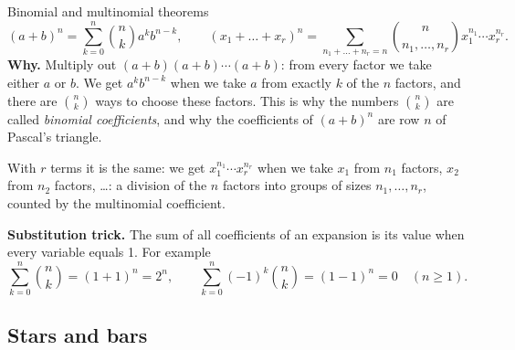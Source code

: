 \begin{key}{Binomial and multinomial theorems}
	\[ (a+b)^n=\sum_{k=0}^n\binom nk a^kb^{n-k},\qquad
		(x_1+\dots+x_r)^n=\sum_{n_1+\dots+n_r=n}\binom{n}{n_1,\dots,n_r}
		x_1^{n_1}\cdots x_r^{n_r}. \]
	\textbf{Why.} Multiply out $(a+b)(a+b)\cdots(a+b)$: from every factor we
	take either $a$ or $b$. We get $a^kb^{n-k}$ when we take $a$ from exactly
	$k$ of the $n$ factors, and there are $\binom nk$ ways to choose these
	factors. This is why the numbers $\binom nk$ are called \emph{binomial
		coefficients}, and why the coefficients of $(a+b)^n$ are row $n$ of
	Pascal's triangle.

	With $r$ terms it is the same: we get $x_1^{n_1}\cdots x_r^{n_r}$ when we
	take $x_1$ from $n_1$ factors, $x_2$ from $n_2$ factors, \dots: a division
	of the $n$ factors into groups of sizes $n_1,\dots,n_r$, counted by the
	multinomial coefficient.

	\textbf{Substitution trick.} The sum of all coefficients of an expansion is
	its value when every variable equals 1. For example
	\[ \sum_{k=0}^n\binom nk=(1+1)^n=2^n,\qquad
		\sum_{k=0}^n(-1)^k\binom nk=(1-1)^n=0\quad(n\ge1). \]
\end{key}


\subsection*{Stars and bars}

